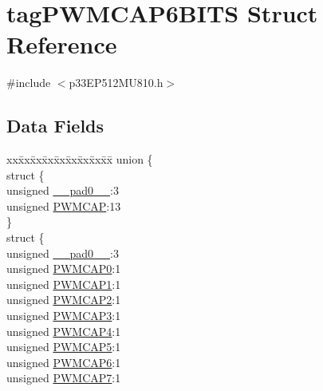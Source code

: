 \hypertarget{structtag_p_w_m_c_a_p6_b_i_t_s}{}\section{tag\+P\+W\+M\+C\+A\+P6\+B\+I\+TS Struct Reference}
\label{structtag_p_w_m_c_a_p6_b_i_t_s}


{\ttfamily \#include $<$p33\+E\+P512\+M\+U810.\+h$>$}

\subsection*{Data Fields}
\begin{DoxyCompactItemize}
\item 
\begin{tabbing}
xx\=xx\=xx\=xx\=xx\=xx\=xx\=xx\=xx\=\kill
union \{\\
\>struct \{\\
\>\>unsigned \hyperlink{structtag_p_w_m_c_a_p6_b_i_t_s_adf71f3d8410c1f1dbbc96680a92c49af}{\_\_pad0\_\_}:3\\
\>\>unsigned \hyperlink{structtag_p_w_m_c_a_p6_b_i_t_s_a3877a5299772d03214ef452994c53979}{PWMCAP}:13\\
\>\} \\
\>struct \{\\
\>\>unsigned \hyperlink{structtag_p_w_m_c_a_p6_b_i_t_s_adf71f3d8410c1f1dbbc96680a92c49af}{\_\_pad0\_\_}:3\\
\>\>unsigned \hyperlink{structtag_p_w_m_c_a_p6_b_i_t_s_a34c685289d01ac79a9b067b945e411b0}{PWMCAP0}:1\\
\>\>unsigned \hyperlink{structtag_p_w_m_c_a_p6_b_i_t_s_a4c90f0d96eece06b7d6c7e41e394b417}{PWMCAP1}:1\\
\>\>unsigned \hyperlink{structtag_p_w_m_c_a_p6_b_i_t_s_a2111a4368f6512c24cf193f6c83672e3}{PWMCAP2}:1\\
\>\>unsigned \hyperlink{structtag_p_w_m_c_a_p6_b_i_t_s_a5d3e7376fc29096ef98492e81f73590d}{PWMCAP3}:1\\
\>\>unsigned \hyperlink{structtag_p_w_m_c_a_p6_b_i_t_s_a07f7fb680f8c9bdd5d3c94a84a30a7b5}{PWMCAP4}:1\\
\>\>unsigned \hyperlink{structtag_p_w_m_c_a_p6_b_i_t_s_a434b71ab2093a53faf535c8f27973f7b}{PWMCAP5}:1\\
\>\>unsigned \hyperlink{structtag_p_w_m_c_a_p6_b_i_t_s_a4249adbed71df183d967bd51f8d811fa}{PWMCAP6}:1\\
\>\>unsigned \hyperlink{structtag_p_w_m_c_a_p6_b_i_t_s_a282c7ae90ac64b1a78eb1351a7d0eee0}{PWMCAP7}:1\\

\end{tabbing}
\end{DoxyCompactItemize}
